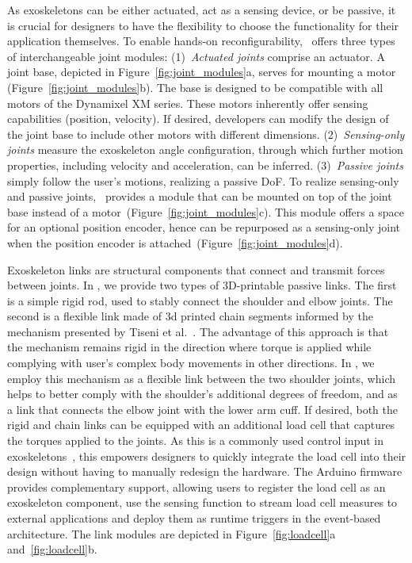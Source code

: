 As exoskeletons can be either actuated, act as a sensing device, or be passive, it is crucial for designers to have the flexibility to choose the functionality for their application themselves. To enable hands-on reconfigurability, \toolkit~offers three types of interchangeable joint modules: (1)~\textit{Actuated joints} comprise an actuator. A joint base, depicted in Figure~\ref{fig:joint_modules}a, serves for mounting a motor (Figure~\ref{fig:joint_modules}b). The base is designed to be compatible with all motors of the Dynamixel XM series. These motors inherently offer sensing capabilities (position, velocity). If desired, developers can modify the design of the joint base to include other motors with different dimensions. 
(2)~\textit{Sensing-only joints} measure the exoskeleton angle configuration, through which further motion properties, including velocity and acceleration, can be inferred. (3)~\textit{Passive joints} simply follow the user's motions, realizing a passive DoF. 
To realize sensing-only and passive joints, \toolkit~provides a module that can be mounted on top of the joint base instead of a motor~(Figure~\ref{fig:joint_modules}c). 
This module offers a space for an optional position encoder, hence can be repurposed as a sensing-only joint when the position encoder is attached~(Figure~\ref{fig:joint_modules}d). 

Exoskeleton links are structural components that connect and transmit forces between joints. In \toolkit, we provide two types of 3D-printable passive links. The first is a simple rigid rod, used to stably connect the shoulder and elbow joints. The second is a flexible link made of 3d printed chain segments informed by the mechanism presented by Tiseni et al.~\cite{tiseni_2019}. The advantage of this approach is that the mechanism remains rigid in the direction where torque is applied while complying with user's complex body movements in other directions. In \toolkit, we employ this mechanism as a flexible link between the two shoulder joints, which helps to better comply with the shoulder's additional degrees of freedom, and as a link that connects the elbow joint with the lower arm cuff. 
If desired, both the rigid and chain links can be equipped with an additional load cell that captures the torques applied to the joints. As this is a commonly used control input in exoskeletons~\cite{gull_2020}, this empowers designers to quickly integrate the load cell into their design without having to manually redesign the hardware. The Arduino firmware provides complementary support, allowing users to register the load cell as an exoskeleton component, use the sensing function to stream load cell measures to external applications and deploy them as runtime triggers in the event-based architecture. 
The link modules are depicted in Figure~\ref{fig:loadcell}a and~\ref{fig:loadcell}b.

